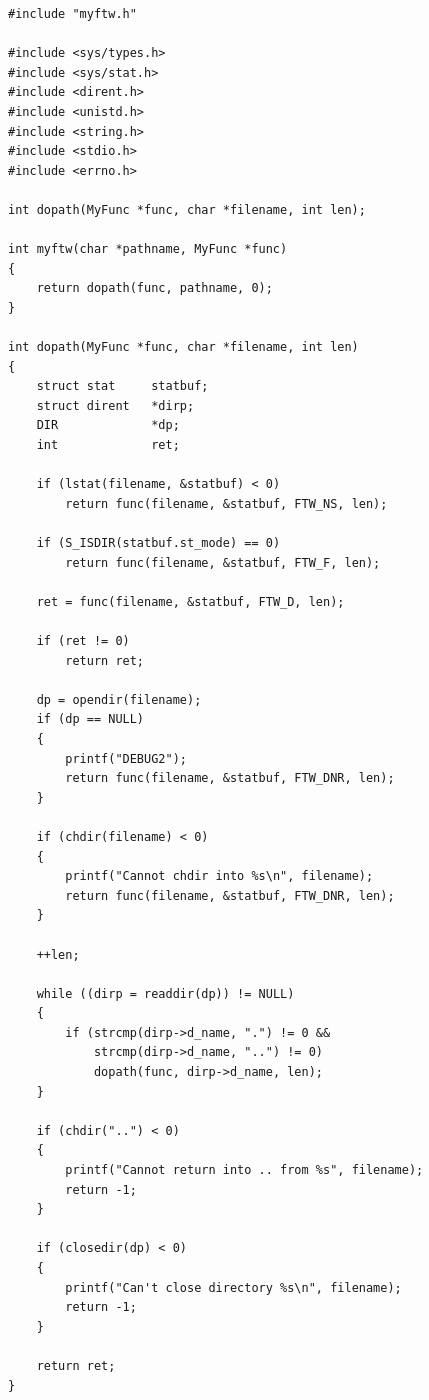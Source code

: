 \begin{lstlisting}[caption={Рекурсивная реализация myftw}]
#include "myftw.h"

#include <sys/types.h>
#include <sys/stat.h>
#include <dirent.h>
#include <unistd.h>
#include <string.h>
#include <stdio.h>
#include <errno.h>

int dopath(MyFunc *func, char *filename, int len);

int myftw(char *pathname, MyFunc *func)
{
    return dopath(func, pathname, 0);
}

int dopath(MyFunc *func, char *filename, int len)
{
    struct stat     statbuf;
    struct dirent   *dirp;
    DIR             *dp;
    int             ret;

    if (lstat(filename, &statbuf) < 0)
        return func(filename, &statbuf, FTW_NS, len);

    if (S_ISDIR(statbuf.st_mode) == 0)
        return func(filename, &statbuf, FTW_F, len);

    ret = func(filename, &statbuf, FTW_D, len);

    if (ret != 0)
        return ret;

    dp = opendir(filename);
    if (dp == NULL)
    {
        printf("DEBUG2");
        return func(filename, &statbuf, FTW_DNR, len);
    }

    if (chdir(filename) < 0)
    {
        printf("Cannot chdir into %s\n", filename);
        return func(filename, &statbuf, FTW_DNR, len);
    }

    ++len;

    while ((dirp = readdir(dp)) != NULL)
    {
        if (strcmp(dirp->d_name, ".") != 0 &&
            strcmp(dirp->d_name, "..") != 0)
            dopath(func, dirp->d_name, len);
    }

    if (chdir("..") < 0)
    {
        printf("Cannot return into .. from %s", filename);
        return -1;
    }

    if (closedir(dp) < 0)
    {
        printf("Can't close directory %s\n", filename);
        return -1;
    }

    return ret;
}
\end{lstlisting}



